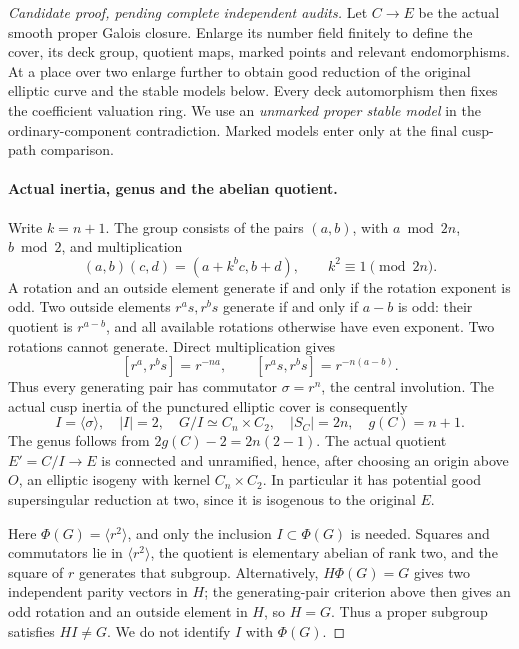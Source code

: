 \begin{proof}[Candidate proof, pending complete independent audits]
Let \(C\to E\) be the actual smooth proper Galois closure.
Enlarge its number field finitely to define the cover, its deck
group, quotient maps, marked points and relevant endomorphisms.
At a place over two enlarge further to obtain good reduction
of the original elliptic curve and the stable models below.
Every deck automorphism then fixes the coefficient valuation
ring. We use an \emph{unmarked proper stable model} in the
ordinary-component contradiction. Marked models enter only
at the final cusp-path comparison.

\paragraph{Actual inertia, genus and the abelian quotient.}
Write \(k=n+1\). The group consists of the pairs
\((a,b)\), with \(a\bmod2n\), \(b\bmod2\), and multiplication
\[
 (a,b)(c,d)=(a+k^b c,b+d),\qquad k^2\equiv1\pmod{2n}.
                                                        \tag{A.75.2}
\]
A rotation and an outside element generate if and only if
the rotation exponent is odd. Two outside elements
\(r^a s,r^b s\) generate if and only if \(a-b\) is odd:
their quotient is \(r^{a-b}\), and all available rotations
otherwise have even exponent. Two rotations cannot generate.
Direct multiplication gives
\[
 [r^a,r^b s]=r^{-na},\qquad
 [r^a s,r^b s]=r^{-n(a-b)}.                            \tag{A.75.3}
\]
Thus every generating pair has commutator
\(\sigma=r^n\), the central involution. The actual cusp
inertia of the punctured elliptic cover is consequently
\[
 I=\langle\sigma\rangle,\quad |I|=2,\quad
 G/I\simeq C_n\times C_2,
 \quad |S_C|=2n,
 \quad g(C)=n+1.                                      \tag{A.75.4}
\]
The genus follows from \(2g(C)-2=2n(2-1)\).
The actual quotient \(E'=C/I\to E\) is connected and
unramified, hence, after choosing an origin above \(O\),
an elliptic isogeny with kernel \(C_n\times C_2\).
In particular it has potential good supersingular reduction
at two, since it is isogenous to the original \(E\).

Here \(\Phi(G)=\langle r^2\rangle\), and only the inclusion
\(I\subset\Phi(G)\) is needed. Squares and commutators lie
in \(\langle r^2\rangle\), the quotient is elementary
abelian of rank two, and the square of \(r\) generates
that subgroup. Alternatively, \(H\Phi(G)=G\) gives two
independent parity vectors in \(H\); the generating-pair
criterion above then gives an odd rotation and an outside
element in \(H\), so \(H=G\). Thus a proper subgroup
satisfies \(HI\ne G\). We do not identify \(I\) with
\(\Phi(G)\).


\end{proof}
